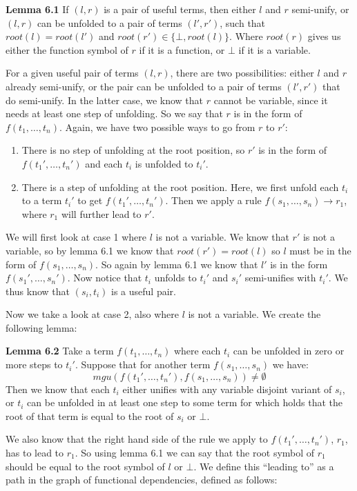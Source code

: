 \textbf{Lemma 6.1} If $(l, r)$ is a pair of useful terms, then either $l$ and $r$ semi-unify, or $(l, r)$ can be unfolded to a pair of terms $(l', r')$, such that $\textit{root}(l) = \textit{root}(l')$ and $\textit{root}(r') \in \{ \bot, \textit{root}(l) \}$. Where $\textit{root}(r)$ gives us either the function symbol of $r$ if it is a function, or $\bot$ if it is a variable. 

For a given useful pair of terms $(l, r)$, there are two possibilities: either $l$ and $r$ already semi-unify, or the pair can be unfolded to a pair of terms $(l', r')$ that do semi-unify. In the latter case, we know that $r$ cannot be variable, since it needs at least one step of unfolding. So we say that $r$ is in the form of $f(t_1, \dots, t_n)$. Again, we have two possible ways to go from $r$ to $r'$: 
\begin{enumerate}
    \itemsep 0em
    \item There is no step of unfolding at the root position, so $r'$ is in the form of $f(t_1', \dots, t_n')$ and each $t_i$ is unfolded to $t_i'$. 
    \item There is a step of unfolding at the root position. Here, we first unfold each $t_i$ to a term $t_i'$ to get $f(t_1', \dots, t_n')$. Then we apply a rule $f(s_1, \dots, s_n) \rightarrow r_1$, where $r_1$ will further lead to $r'$. 
\end{enumerate}
We will first look at case 1 where $l$ is not a variable. We know that $r'$ is not a variable, so by lemma 6.1 we know that $\textit{root}(r') = \textit{root}(l)$ so $l$ must be in the form of $f(s_1, \dots, s_n)$. So again by lemma 6.1 we know that $l'$ is in the form $f(s_1', \dots, s_n')$. Now notice that $t_i$ unfolds to $t_i'$ and $s_i'$ semi-unifies with $t_i'$. We thus know that $(s_i, t_i)$ is a useful pair. 

Now we take a look at case 2, also where $l$ is not a variable. We create the following lemma: 

\textbf{Lemma 6.2} Take a term $f(t_1, \dots, t_n)$ where each $t_i$ can be unfolded in zero or more steps to $t_i'$. Suppose that for another term $f(s_1, \dots, s_n)$ we have: 
\[
\textit{mgu}(f(t_1', \dots, t_n'), f(s_1, \dots, s_n)) \neq \emptyset
\]
Then we know that each $t_i$ either unifies with any variable disjoint variant of $s_i$, or $t_i$ can be unfolded in at least one step to some term for which holds that the root of that term is equal to the root of $s_i$ or $\bot$. 

We also know that the right hand side of the rule we apply to $f(t_1', \dots, t_n')$, $r_1$, has to lead to $r_1$. So using lemma 6.1 we can say that the root symbol of $r_1$ should be equal to the root symbol of $l$ or $\bot$. We define this ``leading to'' as a path in the graph of functional dependencies, defined as follows:

